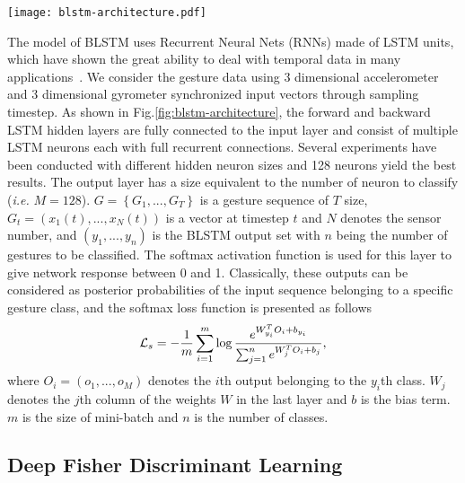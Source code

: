\documentclass[review]{elsarticle}
\begin{document}
\begin{figure*}
	\centering
	\texttt{[image: blstm-architecture.pdf]}
	\caption{{The architecture of F-BLSTM. We intuitively change the loss function of BLSTM, and the resulting algorithm does not affect the training convergence and the model size, but leading to a performance improvement.}}
	\label{fig:blstm-architecture}
\end{figure*}

The model of {BLSTM uses Recurrent Neural Nets (RNNs)} made of LSTM units, which have shown the great ability to deal with temporal data in many applications~\cite{sundermeyer2012lstm}. We consider the gesture data using 3 dimensional accelerometer and 3 dimensional gyrometer synchronized input vectors through sampling timestep. As shown in Fig.\;\ref{fig:blstm-architecture}, the forward and backward LSTM hidden layers are fully connected to the input layer and consist of multiple LSTM neurons each with full recurrent connections. Several experiments have been conducted with different hidden neuron sizes and 128 neurons yield the best results. The output layer has a size equivalent to the number of neuron to classify (\emph{i.e.} $M=128$). $G = \left\{ {G_1,...,G_{T}} \right\}$ is a gesture sequence of $T$ size, $G_t = \left(x_1\left(t\right),...,x_{N}\left(t\right)\right)$ is a vector at timestep $t$ and $N$ denotes the sensor number, and $\left(y_1,...,y_{n}\right)$ is the BLSTM output set with $n$ being the number of gestures to be classified. The softmax activation function is used for this layer to give network response between 0 and 1. Classically, these outputs can be considered as posterior probabilities of the input sequence belonging to a specific gesture class, and the softmax loss function is presented as follows
\begin{equation}{\cal L}_s =  - \frac{1}{m} \sum\limits_{i = 1}^m \log \frac{{{e^{W_{{y_i}}^T{O_i} + {b_{{y_{i}}}}}}}}{{\sum\nolimits_{j = 1}^n {{e^{W_j^T{O_i} + {b_j}}}} }},
	\label{eq:softmaxloss}
\end{equation}
where $O_i =\left(o_1,...,o_M\right)$ denotes the {$i$th output belonging to the $y_i$th class}. $W_j$ denotes the $j$th column of the weights $W$ in the last layer and $b$ is the bias term. $m$ is the size of mini-batch and $n$ is the number of classes.



\subsection{Deep Fisher Discriminant Learning }\label{sec:fisherloss}
\end{document}
